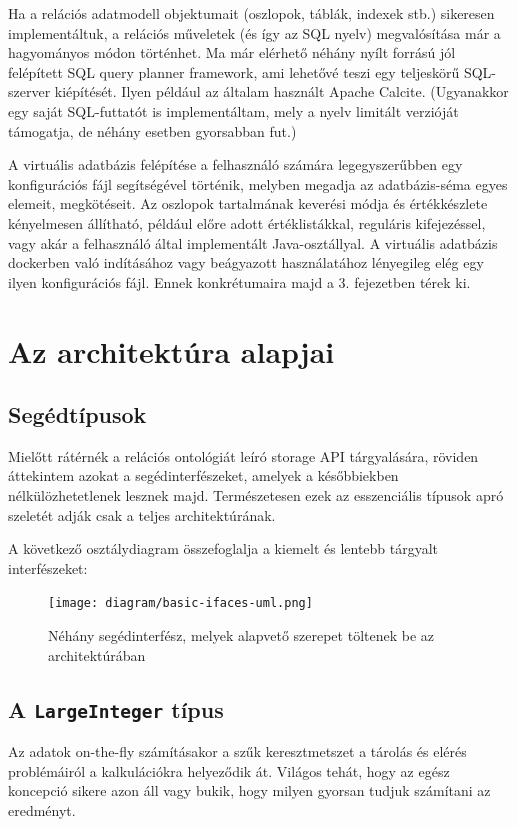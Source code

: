 \documentclass[
    parspace,
    noindent,
    nohyp,
]{elteiktdk}[2023/04/10]
\begin{document}
Ha a relációs adatmodell objektumait (oszlopok, táblák, indexek stb.) sikeresen implementáltuk,
a relációs műveletek (és így az SQL nyelv) megvalósítása már a hagyományos módon történhet.
Ma már elérhető néhány nyílt forrású jól felépített SQL query planner framework,
ami lehetővé teszi egy teljeskörű SQL-szerver kiépítését.
Ilyen például az általam használt Apache Calcite.
(Ugyanakkor egy saját SQL-futtatót is implementáltam,
mely a nyelv limitált verzióját támogatja, de néhány esetben gyorsabban fut.)

A virtuális adatbázis felépítése a felhasználó számára legegyszerűbben
egy konfigurációs fájl segítségével történik,
melyben megadja az adatbázis-séma egyes elemeit, megkötéseit.
Az oszlopok tartalmának keverési módja és értékkészlete kényelmesen állítható,
például előre adott értéklistákkal, reguláris kifejezéssel,
vagy akár a felhasználó által implementált Java-osztállyal.
A virtuális adatbázis dockerben való indításához vagy beágyazott használatához
lényegileg elég egy ilyen konfigurációs fájl.
Ennek konkrétumaira majd a 3. fejezetben térek ki.

\section{Az architektúra alapjai}

\subsection{Segédtípusok}

Mielőtt rátérnék a relációs ontológiát leíró storage API tárgyalására,
röviden áttekintem azokat a segédinterfészeket,
amelyek a későbbiekben nélkülözhetetlenek lesznek majd.
Természetesen ezek az esszenciális típusok apró szeletét adják csak a teljes architektúrának.

A következő osztálydiagram összefoglalja a kiemelt és lentebb tárgyalt interfészeket:

\begin{figure}[H]
\centering
\texttt{[image: diagram/basic-ifaces-uml.png]}
\caption{Néhány segédinterfész, melyek alapvető szerepet töltenek be az architektúrában}
\end{figure}

\subsection{A \texttt{LargeInteger} típus}

Az adatok on-the-fly számításakor a szűk keresztmetszet
a tárolás és elérés problémáiról a kalkulációkra helyeződik át.
Világos tehát, hogy az egész koncepció sikere azon áll vagy bukik,
hogy milyen gyorsan tudjuk számítani az eredményt.
\end{document}
